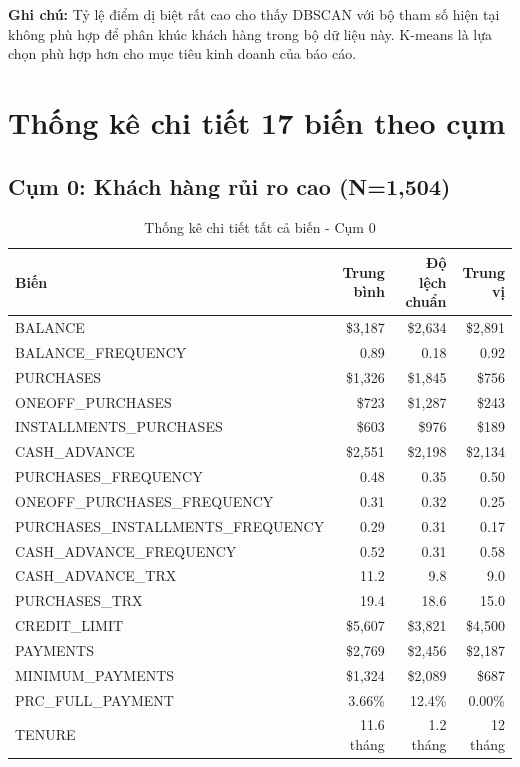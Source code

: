 \textbf{Ghi chú:} Tỷ lệ điểm dị biệt rất cao cho thấy DBSCAN với bộ tham số hiện tại không phù hợp để phân khúc khách hàng trong bộ dữ liệu này. K-means là lựa chọn phù hợp hơn cho mục tiêu kinh doanh của báo cáo.

\section{Thống kê chi tiết 17 biến theo cụm}

\subsection{Cụm 0: Khách hàng rủi ro cao (N=1,504)}

\begin{table}[H]
\centering
\caption{Thống kê chi tiết tất cả biến - Cụm 0}
\small
\begin{tabular}{|l|r|r|r|}
\hline
\textbf{Biến} & \textbf{Trung bình} & \textbf{Độ lệch chuẩn} & \textbf{Trung vị} \\
\hline
BALANCE & \$3,187 & \$2,634 & \$2,891 \\
\hline
BALANCE\_FREQUENCY & 0.89 & 0.18 & 0.92 \\
\hline
PURCHASES & \$1,326 & \$1,845 & \$756 \\
\hline
ONEOFF\_PURCHASES & \$723 & \$1,287 & \$243 \\
\hline
INSTALLMENTS\_PURCHASES & \$603 & \$976 & \$189 \\
\hline
CASH\_ADVANCE & \$2,551 & \$2,198 & \$2,134 \\
\hline
PURCHASES\_FREQUENCY & 0.48 & 0.35 & 0.50 \\
\hline
ONEOFF\_PURCHASES\_FREQUENCY & 0.31 & 0.32 & 0.25 \\
\hline
PURCHASES\_INSTALLMENTS\_FREQUENCY & 0.29 & 0.31 & 0.17 \\
\hline
CASH\_ADVANCE\_FREQUENCY & 0.52 & 0.31 & 0.58 \\
\hline
CASH\_ADVANCE\_TRX & 11.2 & 9.8 & 9.0 \\
\hline
PURCHASES\_TRX & 19.4 & 18.6 & 15.0 \\
\hline
CREDIT\_LIMIT & \$5,607 & \$3,821 & \$4,500 \\
\hline
PAYMENTS & \$2,769 & \$2,456 & \$2,187 \\
\hline
MINIMUM\_PAYMENTS & \$1,324 & \$2,089 & \$687 \\
\hline
PRC\_FULL\_PAYMENT & 3.66\% & 12.4\% & 0.00\% \\
\hline
TENURE & 11.6 tháng & 1.2 tháng & 12 tháng \\
\hline
\end{tabular}
\end{table}

